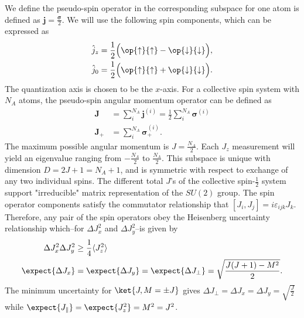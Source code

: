 We define the pseudo-spin operator in the corresponding subspace for one atom is defined as $ \mathbf{j}=\frac{\boldsymbol{\sigma}}{2} $. We will use  the following spin components, which can be expressed as
\begin{align}
\hat{j}_z &= \frac{1}{2} \Big( \op{\uparrow}{\uparrow} - \op{\downarrow}{\downarrow}  \Big), \\
\hat{j}_0 &= \frac{1}{2} \Big( \op{\uparrow}{\uparrow} + \op{\downarrow}{\downarrow}  \Big).
\end{align}
The quantization axis is chosen to be the $ x $-axis. For a collective spin system with $ N_A $ atoms, the pseudo-spin angular momentum operator can be defined as
\begin{align}
\mathbf{J} &=\sum_i^{N_A}\mathbf{j}^{(i)}=\frac{1}{2}\sum_i^{N_A} \boldsymbol{\sigma}^{(i)}\\
\mathbf{J}_+ &=\sum_i^{N_A} \boldsymbol{\sigma}^{(i)}_+.
\end{align}
The maximum possible angular momentum is $ J=\frac{N_A}{2} $. Each $ J_z $ measurement will yield an eigenvalue ranging from $ -\frac{N_A}{2} $ to $ \frac{N_A}{2} $.  This subspace is unique with dimension $ D=2J+1=N_A+1 $, and is symmetric with respect to exchange of any two individual spins. The different total $ J $'s of the collective spin-$ \frac{1}{2} $ system support "irreducible" matrix representation of the $ SU(2) $ group. The spin operator components satisfy the commutator relationship that $ [J_i,J_j]=i\varepsilon_{ijk}J_k $. Therefore, any pair of the spin operators obey the Heisenberg uncertainty relationship which--for $ \Delta J_x^2 $ and $ \Delta J_y^2 $--is given by 
\begin{align}
\Delta J_x^2\Delta J_y^2 &\ge \frac{1}{4}\langle J_z^2\rangle \\
\expect{\Delta J_x} &=\expect{\Delta J_y}=\expect{\Delta J_{\perp}}=\sqrt{\frac{J(J+1)-M^2}{2}}.
\end{align}
The minimum uncertainty for $ \ket{J,M=\pm J} $ gives $ \Delta J_\perp=\Delta J_x=\Delta J_y = \sqrt{\frac{J}{2}} $ while $ \expect{J_\parallel}=\expect{J_z^2}=M^2=J^2 $. 

